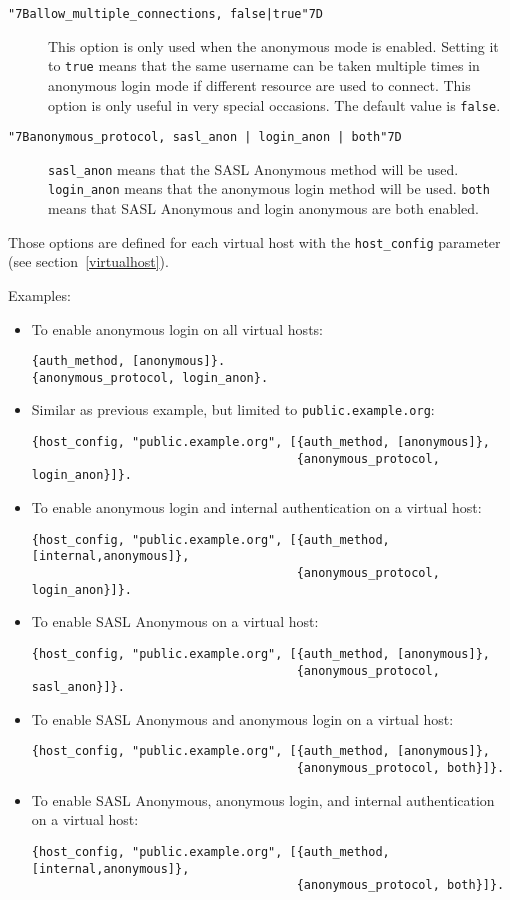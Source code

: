 \documentclass[a4paper,10pt]{book}
\newcommand{\bracehack}{\def\{{\char"7B}\def\}{\char"7D}}
\newcommand{\titem}[1]{\item[\bracehack\texttt{#1}]}
\newcommand{\jid}[1]{\texttt{#1}}
\newcommand{\term}[1]{\texttt{#1}}
\begin{document}
\begin{description}
\titem{\{allow\_multiple\_connections, false|true\}} This option is only used
  when the anonymous mode is
  enabled. Setting it to \term{true} means that the same username can be taken
  multiple times in anonymous login mode if different resource are used to
  connect. This option is only useful in very special occasions. The default
  value is \term{false}.
\titem{\{anonymous\_protocol, sasl\_anon | login\_anon | both\}} 
  \term{sasl\_anon} means
  that the SASL Anonymous method will be used. \term{login\_anon} means that the
  anonymous login method will be used. \term{both} means that SASL Anonymous and
  login anonymous are both enabled.
\end{description}

Those options are defined for each virtual host with the \term{host\_config}
parameter (see section~\ref{virtualhost}).

Examples:
\begin{itemize}
\item To enable anonymous login on all virtual hosts:
\begin{verbatim}
{auth_method, [anonymous]}.
{anonymous_protocol, login_anon}.
\end{verbatim}
\item Similar as previous example, but limited to \jid{public.example.org}:
\begin{verbatim}
{host_config, "public.example.org", [{auth_method, [anonymous]},
                                     {anonymous_protocol, login_anon}]}.
\end{verbatim}
\item To enable anonymous login and internal authentication on a virtual host:
\begin{verbatim}
{host_config, "public.example.org", [{auth_method, [internal,anonymous]},
                                     {anonymous_protocol, login_anon}]}.
\end{verbatim}
\item To enable SASL Anonymous on a virtual host:
\begin{verbatim}
{host_config, "public.example.org", [{auth_method, [anonymous]},
                                     {anonymous_protocol, sasl_anon}]}.
\end{verbatim}
\item To enable SASL Anonymous and anonymous login on a virtual host:
\begin{verbatim}
{host_config, "public.example.org", [{auth_method, [anonymous]},
                                     {anonymous_protocol, both}]}.
\end{verbatim}
\item To enable SASL Anonymous, anonymous login, and internal authentication on
a virtual host:
\begin{verbatim}
{host_config, "public.example.org", [{auth_method, [internal,anonymous]},
                                     {anonymous_protocol, both}]}.
\end{verbatim}
\end{itemize}
\end{document}

